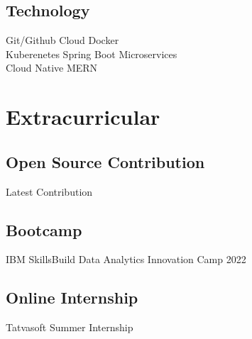 \documentclass[]{deedy-resume-reversed}
\begin{document}
\begin{minipage}[t]{0.33\textwidth}
\subsection{Technology}
Git/Github \textbullet{} Cloud \textbullet{} Docker \\
Kuberenetes \textbullet{} Spring Boot \textbullet{} Microservices \\
Cloud Native \textbullet{} MERN \\
\sectionsep


\section{Extracurricular}
\subsection{Open Source Contribution}
Latest Contribution
\sectionsep

\subsection{Bootcamp}
IBM SkillsBuild Data Analytics Innovation Camp 2022 \\
\sectionsep

\subsection{Online Internship}
Tatvasoft Summer Internship \\
\sectionsep


\end{minipage}
\end{document}
